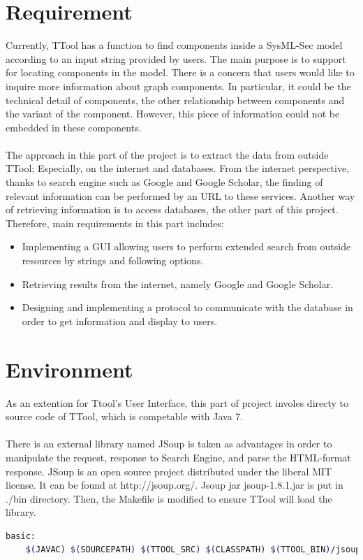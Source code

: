 \documentclass[a4paper,12pt,oneside]{report}
\begin{document}
		\section{Requirement}
Currently, TTool has a function to find components inside a SysML-Sec model according to an input string provided by users. The main purpose is to support for locating components in the model. There is a concern that users would like to inquire more information about graph components. In particular, it could be the technical detail of components, the other relationship between components and the variant of the component. However, this piece of information could not be embedded in these components. \\\\
The approach in this part of the project is to extract the data from outside TTool; Especially, on the internet and databases. From the internet perspective, thanks to search engine such as Google and Google Scholar, the finding of relevant information can be performed by an URL to these services. Another way of retrieving information is to access databases, the other part of this project. Therefore, main requirements in this part includes:
		\begin{itemize}
			\item  Implementing a GUI allowing users to perform extended search from outside resources by strings and following options.
			\item  Retrieving results from the internet, namely Google and Google Scholar.
			\item Designing and implementing a protocol to communicate with the database in order to get information and display to users.
		\end{itemize}
		\section{Environment}
		As an extention for Ttool's User Interface, this part of project involes directy to source code of TTool, which is competable with Java 7.\\\\
		There is an external library named JSoup\cite{jsoup} is taken as advantages in order to manipulate the request, response to Search Engine, and parse the HTML-format response. JSoup is an open source project distributed under the liberal MIT license. It can be found at http://jsoup.org/. Jsoup jar jsoup-1.8.1.jar is put in ./bin directory. Then, the Makefile is modified to ensure TTool will load the library.
\begin{lstlisting}[language=bash]
	basic:
	$(JAVAC) $(SOURCEPATH) $(TTOOL_SRC) $(CLASSPATH) $(TTOOL_BIN)/jsoup-1.8.1.jar $(TTOOL_SRC)/*.java	
		\end{lstlisting}
\end{document}
